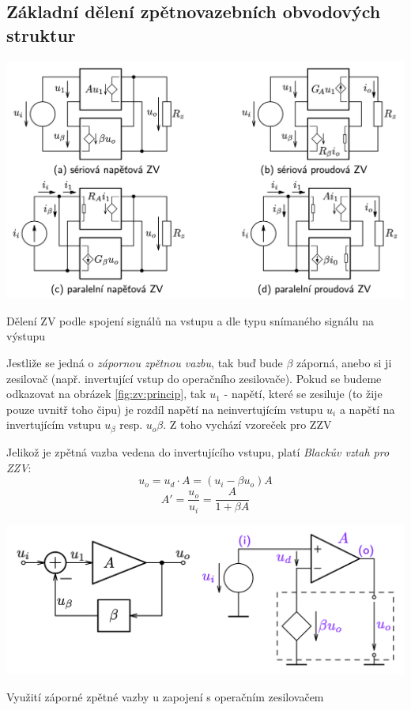 \documentclass[a4paper,12pt]{article}   %
\begin{document}
\subsection{Základní dělení zpětnovazebních obvodových struktur}

\begin{schema}[h!]
    \centering
    \includegraphics[width=.8\textwidth]{ZV-obvody.png}
    \caption{Dělení ZV podle spojení signálů na vstupu a dle typu snímaného signálu na výstupu}
    \label{fig:ZV:deleni}
\end{schema}


Jestliže se jedná o \textit{zápornou zpětnou vazbu}, tak buď bude $\beta$ záporná, anebo si ji  zesilovač (např. invertující vstup do operačního zesilovače). Pokud se budeme odkazovat na obrázek \ref{fig:zv:princip}, tak $u_1$ - napětí, které se zesiluje (to žije pouze uvnitř toho čipu) je rozdíl napětí na neinvertujícím vstupu $u_i$ a napětí na invertujícím vstupu $u_\beta$ resp. $u_o\beta$. Z toho vychází vzoreček pro ZZV

Jelikož je zpětná vazba vedena do invertujícího vstupu, platí \textit{Blackův vztah pro ZZV}:
\begin{equation*}
    u_o = u_d\cdot A = (u_i -\beta u_o) A
\end{equation*}
\begin{equation}
    A' = \frac{u_o}{u_i} = \frac{A}{1+\beta A}
    \label{eq:vysledne:zesileni}
\end{equation}

\begin{schema}[h!]
    \centering
    \includegraphics[width=.7\textwidth]{ZZV-OZ.png}
    \caption{Využití záporné zpětné vazby u zapojení s operačním zesilovačem}
    \label{fig:opamp:ZZV}
\end{schema}
\end{document}

